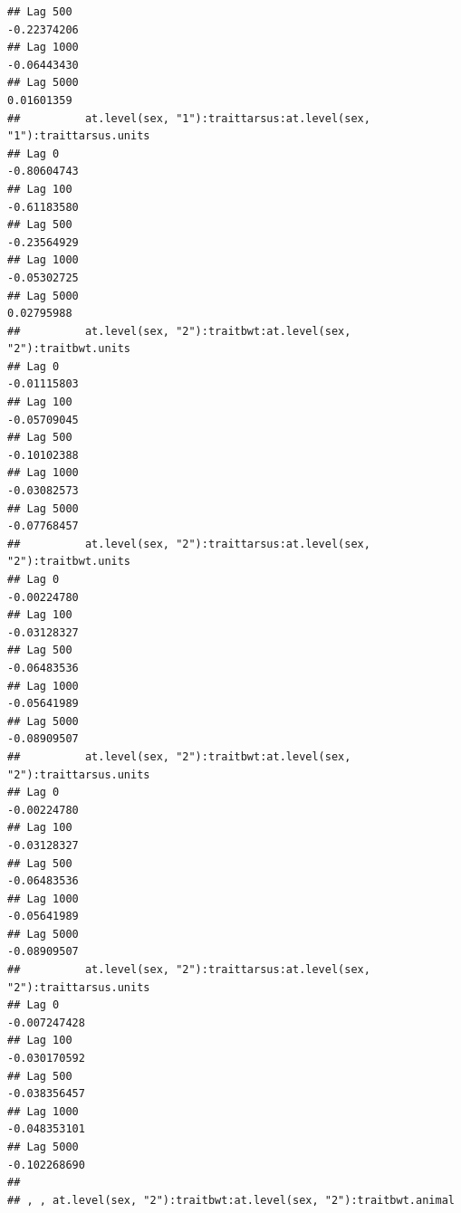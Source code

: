 \documentclass[
  12pt,
]{book}
\begin{document}
\begin{verbatim}
## Lag 500                                                       -0.22374206
## Lag 1000                                                      -0.06443430
## Lag 5000                                                       0.01601359
##          at.level(sex, "1"):traittarsus:at.level(sex, "1"):traittarsus.units
## Lag 0                                                            -0.80604743
## Lag 100                                                          -0.61183580
## Lag 500                                                          -0.23564929
## Lag 1000                                                         -0.05302725
## Lag 5000                                                          0.02795988
##          at.level(sex, "2"):traitbwt:at.level(sex, "2"):traitbwt.units
## Lag 0                                                      -0.01115803
## Lag 100                                                    -0.05709045
## Lag 500                                                    -0.10102388
## Lag 1000                                                   -0.03082573
## Lag 5000                                                   -0.07768457
##          at.level(sex, "2"):traittarsus:at.level(sex, "2"):traitbwt.units
## Lag 0                                                         -0.00224780
## Lag 100                                                       -0.03128327
## Lag 500                                                       -0.06483536
## Lag 1000                                                      -0.05641989
## Lag 5000                                                      -0.08909507
##          at.level(sex, "2"):traitbwt:at.level(sex, "2"):traittarsus.units
## Lag 0                                                         -0.00224780
## Lag 100                                                       -0.03128327
## Lag 500                                                       -0.06483536
## Lag 1000                                                      -0.05641989
## Lag 5000                                                      -0.08909507
##          at.level(sex, "2"):traittarsus:at.level(sex, "2"):traittarsus.units
## Lag 0                                                           -0.007247428
## Lag 100                                                         -0.030170592
## Lag 500                                                         -0.038356457
## Lag 1000                                                        -0.048353101
## Lag 5000                                                        -0.102268690
## 
## , , at.level(sex, "2"):traitbwt:at.level(sex, "2"):traitbwt.animal

\end{verbatim}
\end{document}
